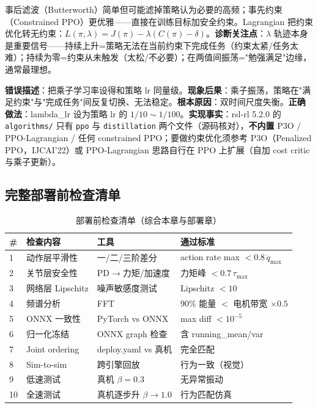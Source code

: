 事后滤波（Butterworth）简单但可能滤掉策略认为必要的高频；事先约束（Constrained PPO）更优雅——直接在训练目标加安全约束。Lagrangian 把约束优化转无约束：$L(\pi,\lambda)=J(\pi)-\lambda(C(\pi)-\delta)$。\textbf{诊断关注点}：$\lambda$ 轨迹本身是重要信号——持续上升=策略无法在当前约束下完成任务（约束太紧/任务太难）；持续为零=约束从未触发（太松/不必要）；在两值间振荡="勉强满足"边缘，通常最理想。

\begin{pitfall}
\textbf{错误描述}：把乘子学习率设得和策略 lr 同量级。\textbf{现象后果}：乘子振荡，策略在"满足约束"与"完成任务"间反复切换、无法稳定。\textbf{根本原因}：双时间尺度失衡。\textbf{正确做法}：lambda\_lr 设为策略 lr 的 $1/10\sim1/100$。\textbf{实现事实}：rsl-rl 5.2.0 的 \verb|algorithms/| 只有 \verb|ppo| 与 \verb|distillation| 两个文件（源码核对），\textbf{不内置} P3O / PPO-Lagrangian / 任何 constrained PPO；要做约束优化须参考 P3O（Penalized PPO，IJCAI'22）或 PPO-Lagrangian 思路自行在 PPO 上扩展（自加 cost critic 与乘子更新）。
\end{pitfall}

\subsection{完整部署前检查清单}

\begin{table}[H]
\centering
\caption{部署前检查清单（综合本章与部署章）}
\label{tab:rlmc-diag-deploylist}
\begin{tabular}{p{0.6cm}p{3.0cm}p{3.6cm}p{4.4cm}}
\hline
\# & 检查内容 & 工具 & 通过标准 \\
\hline
1 & 动作层平滑性 & 一/二/三阶差分 & action rate max $<0.8\,\dot q_{\max}$ \\
2 & 关节层安全性 & PD$\to$力矩/加速度 & 力矩峰 $<0.7\,\tau_{\max}$ \\
3 & 网络层 Lipschitz & 噪声敏感度测试 & Lipschitz $<10$ \\
4 & 频谱分析 & FFT & 90\% 能量 $<$ 电机带宽 $\times 0.5$ \\
5 & ONNX 一致性 & PyTorch vs ONNX & max diff $<10^{-5}$ \\
6 & 归一化冻结 & ONNX graph 检查 & 含 running\_mean/var \\
7 & Joint ordering & deploy.yaml vs 真机 & 完全匹配 \\
8 & Sim-to-sim & 跨引擎回放 & 行为一致（视觉） \\
9 & 低速测试 & 真机 $\beta=0.3$ & 无异常振动 \\
10 & 全速测试 & 真机逐步升 $\beta\to1.0$ & 行为匹配仿真 \\
\hline
\end{tabular}
\end{table}


